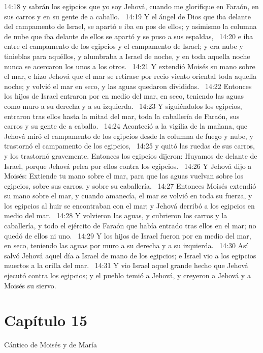 14:18 y sabrán los egipcios que yo soy Jehová, cuando me glorifique en Faraón, en sus carros y en su gente de a caballo.  
14:19 Y el ángel de Dios que iba delante del campamento de Israel, se apartó e iba en pos de ellos; y asimismo la columna de nube que iba delante de ellos se apartó y se puso a sus espaldas,  
14:20 e iba entre el campamento de los egipcios y el campamento de Israel; y era nube y tinieblas para aquéllos, y alumbraba a Israel de noche, y en toda aquella noche nunca se acercaron los unos a los otros.  
14:21 Y extendió Moisés su mano sobre el mar, e hizo Jehová que el mar se retirase por recio viento oriental toda aquella noche; y volvió el mar en seco, y las aguas quedaron divididas.  
14:22 Entonces los hijos de Israel entraron por en medio del mar, en seco, teniendo las aguas como muro a su derecha y a su izquierda.  
14:23 Y siguiéndolos los egipcios, entraron tras ellos hasta la mitad del mar, toda la caballería de Faraón, sus carros y su gente de a caballo.  
14:24 Aconteció a la vigilia de la mañana, que Jehová miró el campamento de los egipcios desde la columna de fuego y nube, y trastornó el campamento de los egipcios,  
14:25 y quitó las ruedas de sus carros, y los trastornó gravemente. Entonces los egipcios dijeron: Huyamos de delante de Israel, porque Jehová pelea por ellos contra los egipcios.  
14:26 Y Jehová dijo a Moisés: Extiende tu mano sobre el mar, para que las aguas vuelvan sobre los egipcios, sobre sus carros, y sobre su caballería.  
14:27 Entonces Moisés extendió su mano sobre el mar, y cuando amanecía, el mar se volvió en toda su fuerza, y los egipcios al huir se encontraban con el mar; y Jehová derribó a los egipcios en medio del mar.  
14:28 Y volvieron las aguas, y cubrieron los carros y la caballería, y todo el ejército de Faraón que había entrado tras ellos en el mar; no quedó de ellos ni uno.  
14:29 Y los hijos de Israel fueron por en medio del mar, en seco, teniendo las aguas por muro a su derecha y a su izquierda.  
14:30 Así salvó Jehová aquel día a Israel de mano de los egipcios; e Israel vio a los egipcios muertos a la orilla del mar.  
14:31 Y vio Israel aquel grande hecho que Jehová ejecutó contra los egipcios; y el pueblo temió a Jehová, y creyeron a Jehová y a Moisés su siervo.  
\section*{Capítulo 15 }
Cántico de Moisés y de María 


